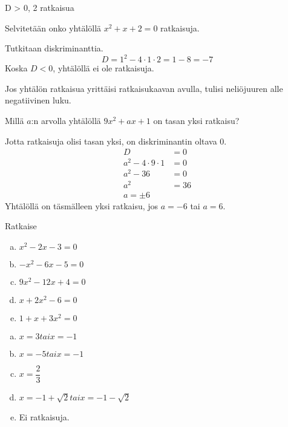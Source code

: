 D > 0, 2 ratkaisua
\begin{kuvaajapohja}{1}{-1}{3}{-2}{2}
\end{kuvaajapohja}

\begin{esimerkki}
Selvitetään onko yhtälöllä $x^2+x+2=0$ ratkaisuja.

Tutkitaan diskriminanttia.
\[D=1^2-4\cdot 1 \cdot 2 = 1-8 = -7\]
Koska $D<0$, yhtälöllä ei ole ratkaisuja.

Jos yhtälön ratkaisua yrittäisi ratkaisukaavan avulla, tulisi neliöjuuren alle negatiivinen luku.
\end{esimerkki}

\begin{esimerkki}
Millä $a$:n arvolla yhtälöllä $9x^2+ax+1$ on tasan yksi ratkaisu?

Jotta ratkaisuja olisi tasan yksi, on diskriminantin oltava 0.
\begin{align*}
D &=0\\
a^2-4\cdot 9\cdot 1 &= 0\\
a^2-36&=0\\
a^2&=36\\
a=\pm6
\end{align*}
Yhtälöllä on täsmälleen yksi ratkaisu, jos $a=-6$ tai $a=6$.
\end{esimerkki}


\Harjoitustehtavat

\begin{tehtava}
    Ratkaise
    \begin{enumerate}[a)]
        \item $x^2 - 2x - 3 = 0$
        \item $-x^2 - 6x - 5 = 0$
        \item $9x^2 - 12x + 4 = 0$
        \item $x + 2x^2 - 6= 0$
        \item $1 + x + 3x^2= 0$
    \end{enumerate}
    \begin{vastaus}
        \begin{enumerate}[a)]
            \item $x = 3 tai x = -1$
            \item $x = -5 tai x = -1$
            \item $x = \dfrac{2}{3}$
            \item $x = -1 + \sqrt{2} tai x = -1 - \sqrt{2}$
            \item Ei ratkaisuja.
        \end{enumerate}
    \end{vastaus}
\end{tehtava}


